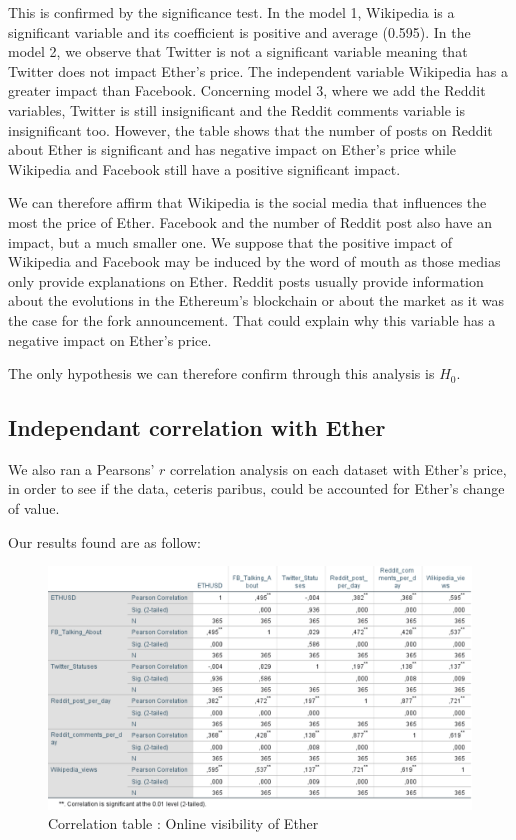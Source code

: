 \documentclass[11pt]{report}
\begin{document}
This is confirmed by the significance test. In the model 1, Wikipedia is a significant variable and its coefficient is positive and average (0.595). In the model 2, we observe that Twitter is not a significant variable meaning that Twitter does not impact Ether’s price. The independent variable Wikipedia has a greater impact than Facebook. Concerning model 3, where we add the Reddit variables, Twitter is still insignificant and the Reddit comments variable is insignificant too. However, the table shows that the number of posts on Reddit about Ether is significant and has negative impact on Ether’s price while Wikipedia and Facebook still have a positive significant impact.\newline

We can therefore affirm that Wikipedia is the social media that influences the most the price of Ether. Facebook and the number of Reddit post also have an impact, but a much smaller one. We suppose that the positive impact of Wikipedia and Facebook may be induced by the word of mouth as those medias only provide explanations on Ether. Reddit posts usually provide information about the evolutions in the Ethereum’s blockchain or about the market as it was the case for the fork announcement. That could explain why this variable has a negative impact on Ether’s price. 

The only hypothesis we can therefore confirm through this analysis is $H_0$.



\clearpage
\subsection*{Independant correlation with Ether}

We also ran a Pearsons' $r$ correlation analysis on each dataset with Ether's price, in order to see if the data, ceteris paribus, could be accounted for Ether's change of value.\newline

Our results found are as follow:
\begin{figure}[!h]
\centering
\includegraphics[scale=0.7]{Chap5/Tablecorrelation}
\caption{Correlation table : Online visibility of Ether}
\end{figure}
\medbreak
\end{document}
